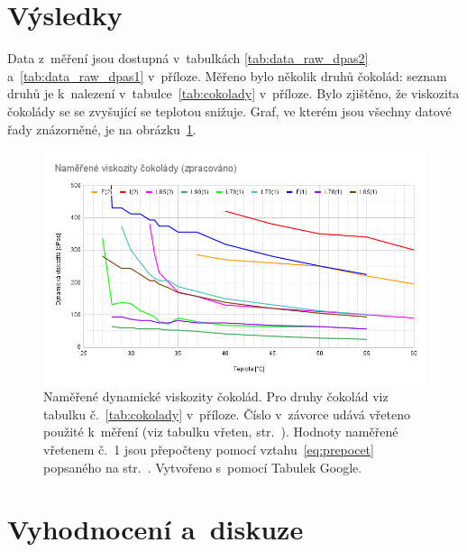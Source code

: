 \documentclass[12pt]{article}
\begin{document}
\newpage%
\section{Výsledky}%

Data z~měření jsou dostupná v~tabulkách \ref{tab:data_raw_dpas2} a~\ref{tab:data_raw_dpas1} v~příloze. Měřeno bylo několik druhů čokolád: seznam druhů je k~nalezení v~tabulce~\ref{tab:cokolady} v~příloze. Bylo zjištěno, že viskozita čokolády se se zvyšující se teplotou snižuje. Graf, ve kterém jsou všechny datové řady znázorněné, je na obrázku~\ref{fig:data_zprac}.

\begin{figure}[h!]
    \centering
    \includegraphics[width = \linewidth]{figures/data_zpracovano.png}
    \caption{Naměřené dynamické viskozity čokolád. Pro druhy čokolád viz tabulku č.~\ref{tab:cokolady} v~příloze. Číslo v~závorce udává vřeteno použité k~měření (viz tabulku vřeten, str.~\pageref{tab:vretena}). Hodnoty naměřené vřetenem č.~1 jsou přepočteny pomocí vztahu~\ref{eq:prepocet} popsaného na str.~\pageref{eq:prepocet}. Vytvořeno s~pomocí Tabulek Google.}
    \label{fig:data_zprac}
\end{figure}

\newpage%
\section{Vyhodnocení a~diskuze}%
\end{document}
